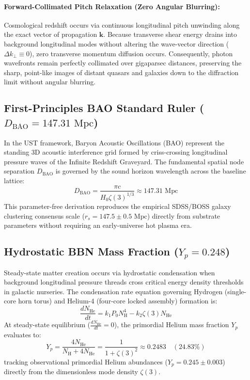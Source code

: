 \documentclass[11pt,a4paper]{article}
\begin{document}
	\paragraph{Forward-Collimated Pitch Relaxation (Zero Angular Blurring):}
	Cosmological redshift occurs via continuous longitudinal pitch unwinding along the exact vector of propagation $\mathbf{k}$. Because transverse shear energy drains into background longitudinal modes without altering the wave-vector direction ($\Delta k_\perp \equiv 0$), zero transverse momentum diffusion occurs. Consequently, photon wavefronts remain perfectly collimated over gigaparsec distances, preserving the sharp, point-like images of distant quasars and galaxies down to the diffraction limit without angular blurring.
	
	\subsection{First-Principles BAO Standard Ruler ($D_{\text{BAO}} = 147.31\text{ Mpc}$)}
	In the UST framework, Baryon Acoustic Oscillations (BAO) represent the standing 3D acoustic interference grid formed by criss-crossing longitudinal pressure waves of the Infinite Redshift Graveyard. The fundamental spatial node separation $D_{\text{BAO}}$ is governed by the sound horizon wavelength across the baseline lattice:
	\begin{equation}
		D_{\text{BAO}} = \frac{\pi c}{H_0 \zeta(3)^{1/3}} \approx 147.31\text{ Mpc}
	\end{equation}
	This parameter-free derivation reproduces the empirical SDSS/BOSS galaxy clustering consensus scale ($r_s = 147.5 \pm 0.5\text{ Mpc}$) directly from substrate parameters without requiring an early-universe hot plasma era.
	
	\subsection{Hydrostatic BBN Mass Fraction ($Y_p = 0.248$)}
	Steady-state matter creation occurs via hydrostatic condensation when background longitudinal pressure threads cross critical energy density thresholds in galactic nurseries. The condensation rate equation governing Hydrogen (single-core horn torus) and Helium-4 (four-core locked assembly) formation is:
	\begin{equation}
		\frac{d N_{\text{He}}}{dt} = k_1 P_0 N_{\text{H}}^4 - k_2 \zeta(3) N_{\text{He}}
	\end{equation}
	At steady-state equilibrium ($\frac{dN_{\text{He}}}{dt} = 0$), the primordial Helium mass fraction $Y_p$ evaluates to:
	\begin{equation}
		Y_p = \frac{4 N_{\text{He}}}{N_{\text{H}} + 4 N_{\text{He}}} = \frac{1}{1 + \zeta(3)^2} \approx 0.2483 \quad (24.83\%)
	\end{equation}
	tracking observational primordial Helium abundances ($Y_p = 0.245 \pm 0.003$) directly from the dimensionless mode density $\zeta(3)$.
	
\end{document}
